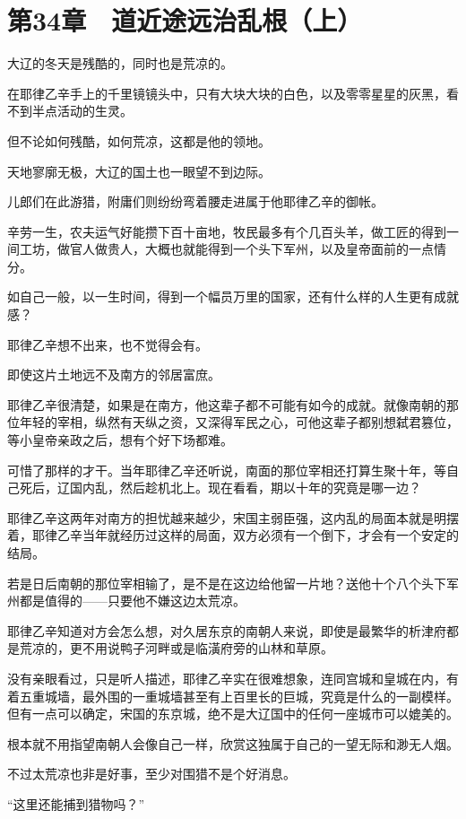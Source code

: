\section{第34章　道近途远治乱根（上）}

大辽的冬天是残酷的，同时也是荒凉的。

在耶律乙辛手上的千里镜镜头中，只有大块大块的白色，以及零零星星的灰黑，看不到半点活动的生灵。

但不论如何残酷，如何荒凉，这都是他的领地。

天地寥廓无极，大辽的国土也一眼望不到边际。

儿郎们在此游猎，附庸们则纷纷弯着腰走进属于他耶律乙辛的御帐。

辛劳一生，农夫运气好能攒下百十亩地，牧民最多有个几百头羊，做工匠的得到一间工坊，做官人做贵人，大概也就能得到一个头下军州，以及皇帝面前的一点情分。

如自己一般，以一生时间，得到一个幅员万里的国家，还有什么样的人生更有成就感？

耶律乙辛想不出来，也不觉得会有。

即使这片土地远不及南方的邻居富庶。

耶律乙辛很清楚，如果是在南方，他这辈子都不可能有如今的成就。就像南朝的那位年轻的宰相，纵然有天纵之资，又深得军民之心，可他这辈子都别想弑君篡位，等小皇帝亲政之后，想有个好下场都难。

可惜了那样的才干。当年耶律乙辛还听说，南面的那位宰相还打算生聚十年，等自己死后，辽国内乱，然后趁机北上。现在看看，期以十年的究竟是哪一边？

耶律乙辛这两年对南方的担忧越来越少，宋国主弱臣强，这内乱的局面本就是明摆着，耶律乙辛当年就经历过这样的局面，双方必须有一个倒下，才会有一个安定的结局。

若是日后南朝的那位宰相输了，是不是在这边给他留一片地？送他十个八个头下军州都是值得的——只要他不嫌这边太荒凉。

耶律乙辛知道对方会怎么想，对久居东京的南朝人来说，即使是最繁华的析津府都是荒凉的，更不用说鸭子河畔或是临潢府旁的山林和草原。

没有亲眼看过，只是听人描述，耶律乙辛实在很难想象，连同宫城和皇城在内，有着五重城墙，最外围的一重城墙甚至有上百里长的巨城，究竟是什么的一副模样。但有一点可以确定，宋国的东京城，绝不是大辽国中的任何一座城市可以媲美的。

根本就不用指望南朝人会像自己一样，欣赏这独属于自己的一望无际和渺无人烟。

不过太荒凉也非是好事，至少对围猎不是个好消息。

“这里还能捕到猎物吗？”

